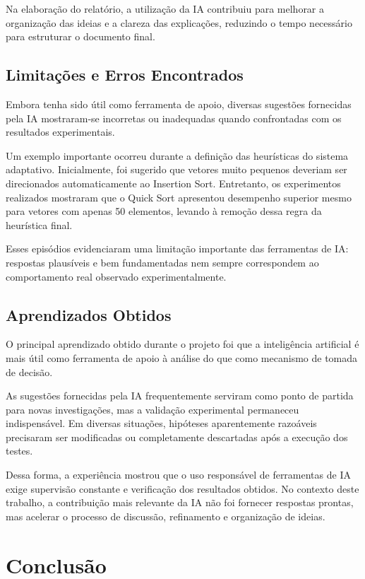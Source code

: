 \documentclass{article}
\begin{document}
Na elaboração do relatório, a utilização da IA contribuiu para melhorar a organização das ideias e a clareza das explicações, reduzindo o tempo necessário para estruturar o documento final.

\subsection{Limitações e Erros Encontrados}
Embora tenha sido útil como ferramenta de apoio, diversas sugestões fornecidas pela IA mostraram-se incorretas ou inadequadas quando confrontadas com os resultados experimentais.

Um exemplo importante ocorreu durante a definição das heurísticas do sistema adaptativo. Inicialmente, foi sugerido que vetores muito pequenos deveriam ser direcionados automaticamente ao Insertion Sort. Entretanto, os experimentos realizados mostraram que o Quick Sort apresentou desempenho superior mesmo para vetores com apenas 50 elementos, levando à remoção dessa regra da heurística final.

Esses episódios evidenciaram uma limitação importante das ferramentas de IA: respostas plausíveis e bem fundamentadas nem sempre correspondem ao comportamento real observado experimentalmente.

\subsection{Aprendizados Obtidos}
O principal aprendizado obtido durante o projeto foi que a inteligência artificial é mais útil como ferramenta de apoio à análise do que como mecanismo de tomada de decisão.

As sugestões fornecidas pela IA frequentemente serviram como ponto de partida para novas investigações, mas a validação experimental permaneceu indispensável. Em diversas situações, hipóteses aparentemente razoáveis precisaram ser modificadas ou completamente descartadas após a execução dos testes.

Dessa forma, a experiência mostrou que o uso responsável de ferramentas de IA exige supervisão constante e verificação dos resultados obtidos. No contexto deste trabalho, a contribuição mais relevante da IA não foi fornecer respostas prontas, mas acelerar o processo de discussão, refinamento e organização de ideias.


\section{Conclusão}
\end{document}
